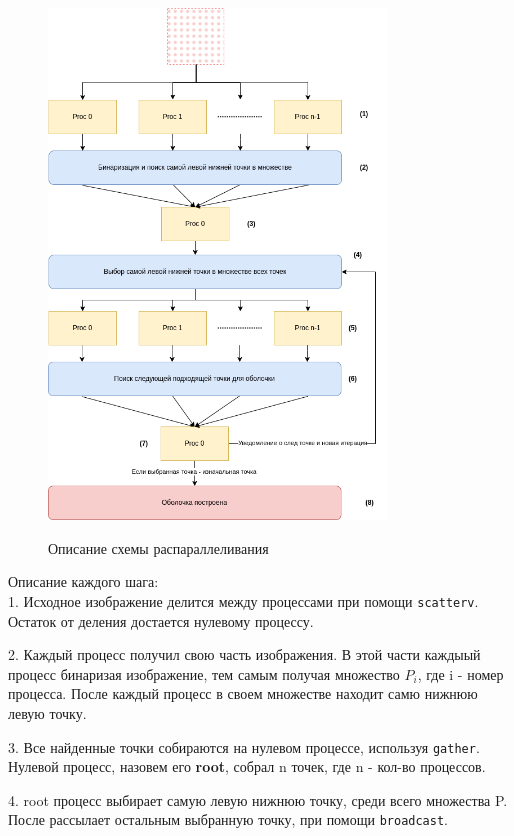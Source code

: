 \documentclass[a4paper, 12pt]{article}
\begin{document}
\begin{figure}[h!]
    \centering
    \includegraphics[width=0.8\textwidth]{images/image.png}\\[5mm]
    \caption{Описание схемы распараллеливания}
    \label{Описание схемы распараллеливания}
\end{figure}

\newpage
Описание каждого шага:\\[2mm]

1. Исходное изображение делится между процессами при помощи \texttt{scatterv}. Остаток от деления достается нулевому процессу.

2. Каждый процесс получил свою часть изображения. В этой части каждыый процесс бинаризая изображение, тем самым получая множество $P_i$, где {i} - номер процесса. После каждый процесс в своем множестве находит самю нижнюю левую точку.

3. Все найденные точки собираются на нулевом процессе, используя \texttt{gather}. Нулевой процесс, назовем его \textbf{root}, собрал {n} точек, где {n} - кол-во процессов.

4. root процесс выбирает самую левую нижнюю точку, среди всего множества {P}. После рассылает остальным выбранную точку, при помощи \texttt{broadcast}.
\end{document}
